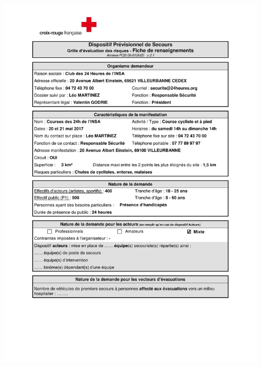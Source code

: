 \documentclass[hidelinks, paper=a4, fontsize=13pt]{report}
\begin{document}
\begin{center}
	\includegraphics[scale=0.70, page=1]{Annexes/Documents/Fiche_RIS_Courses_2017}
\end{center}
\end{document}
